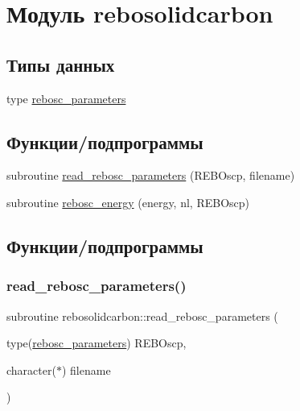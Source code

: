 \hypertarget{namespacerebosolidcarbon}{}\section{Модуль rebosolidcarbon}
\label{namespacerebosolidcarbon}
\subsection*{Типы данных}
\begin{DoxyCompactItemize}
\item 
type \mbox{\hyperlink{structrebosolidcarbon_1_1rebosc__parameters}{rebosc\+\_\+parameters}}
\end{DoxyCompactItemize}
\subsection*{Функции/подпрограммы}
\begin{DoxyCompactItemize}
\item 
subroutine \mbox{\hyperlink{namespacerebosolidcarbon_ac08d3d8f908fa0578d4565b200e96df0}{read\+\_\+rebosc\+\_\+parameters}} (R\+E\+B\+Oscp, filename)
\item 
subroutine \mbox{\hyperlink{namespacerebosolidcarbon_a300f2042f4b21284cfa42c0e4de3f0a8}{rebosc\+\_\+energy}} (energy, nl, R\+E\+B\+Oscp)
\end{DoxyCompactItemize}


\subsection{Функции/подпрограммы}
\mbox{\label{namespacerebosolidcarbon_ac08d3d8f908fa0578d4565b200e96df0}} 
\subsubsection{\texorpdfstring{read\+\_\+rebosc\+\_\+parameters()}{read\_rebosc\_parameters()}}
{\footnotesize\ttfamily subroutine rebosolidcarbon\+::read\+\_\+rebosc\+\_\+parameters (\begin{DoxyParamCaption}\item[{type(\mbox{\hyperlink{structrebosolidcarbon_1_1rebosc__parameters}{rebosc\+\_\+parameters}})}]{R\+E\+B\+Oscp,  }\item[{character($\ast$)}]{filename }\end{DoxyParamCaption})}



